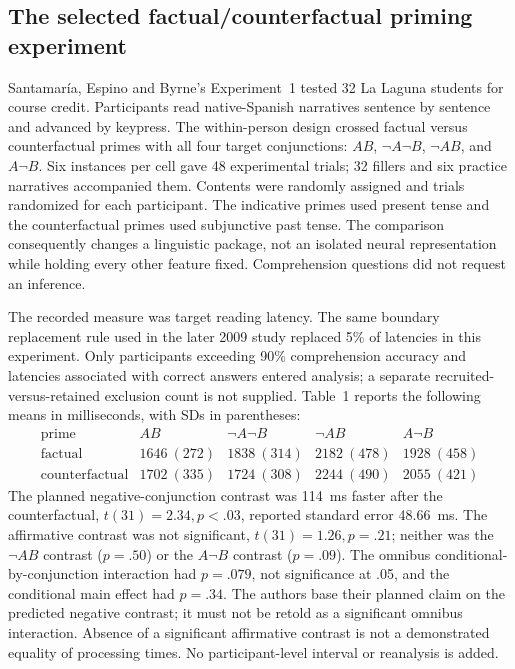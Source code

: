 \subsection{The selected factual/counterfactual priming experiment}

Santamar\'{i}a, Espino and Byrne's Experiment~1 tested 32 La Laguna
students for course credit. Participants read native-Spanish narratives
sentence by sentence and advanced by keypress. The within-person design
crossed factual versus counterfactual primes with all four target
conjunctions: \(AB\), \(\neg A\neg B\), \(\neg AB\), and
\(A\neg B\). Six instances per cell gave 48 experimental trials;
32 fillers and six practice narratives accompanied them. Contents were
randomly assigned and trials randomized for each participant. The
indicative primes used present tense and the counterfactual primes used
subjunctive past tense. The comparison consequently changes a linguistic
package, not an isolated neural representation while holding every other
feature fixed. Comprehension questions did not request an inference.
\cite[pp.~1150--1151]{SantamariaEspinoByrne2005Alternatives}

The recorded measure was target reading latency. The same boundary
replacement rule used in the later 2009 study replaced 5\% of latencies
in this experiment. Only participants exceeding 90\% comprehension
accuracy and latencies associated with correct answers entered analysis;
a separate recruited-versus-retained exclusion count is not supplied.
Table~1 reports the following means in milliseconds, with SDs in
parentheses:
\[
\begin{array}{c|rrrr}
 \text{prime}&AB&\neg A\neg B&\neg AB&A\neg B\\\hline
 \text{factual}&1646\ (272)&1838\ (314)&2182\ (478)&1928\ (458)\\
 \text{counterfactual}&1702\ (335)&1724\ (308)&2244\ (490)&2055\ (421)
\end{array}
\]
The planned negative-conjunction contrast was 114~ms faster after
the counterfactual, \(t(31)=2.34,p<.03\), reported standard error
48.66~ms. The affirmative contrast was not significant,
\(t(31)=1.26,p=.21\); neither was the \(\neg AB\) contrast
(\(p=.50\)) or the \(A\neg B\) contrast (\(p=.09\)).
The omnibus conditional-by-conjunction interaction had \(p=.079\),
not significance at .05, and the conditional main effect had \(p=.34\).
The authors base their planned claim on the predicted negative contrast;
it must not be retold as a significant omnibus interaction. Absence of
a significant affirmative contrast is not a demonstrated equality of
processing times. No participant-level interval or reanalysis is added.

